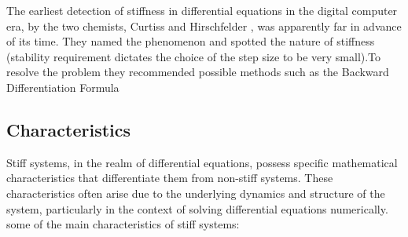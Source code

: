 The earliest detection of stiffness in differential equations in the digital computer era, by the two chemists, Curtiss and Hirschfelder \cite{curtisAndHirscfelder}, was apparently far in advance of its time. They named the phenomenon and spotted the nature of stiffness (stability requirement dictates the choice of the step size to be very small).To resolve the problem they recommended possible methods such as the Backward Differentiation Formula \cite{EMayers}




\subsection{Characteristics}
Stiff systems, in the realm of differential equations, possess specific mathematical characteristics that differentiate them from non-stiff systems. These characteristics often arise due to the underlying dynamics and structure of the system, particularly in the context of solving differential equations numerically. some of the main characteristics of stiff systems:

